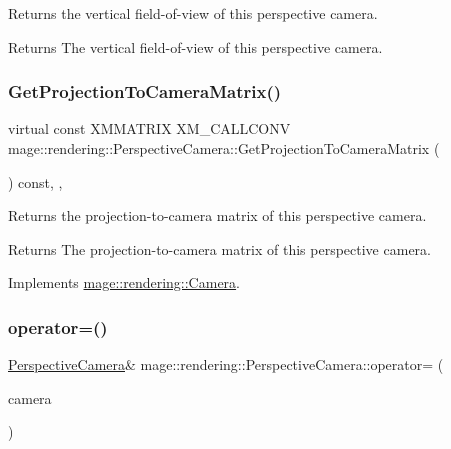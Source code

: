 Returns the vertical field-\/of-\/view of this perspective camera.

\begin{DoxyReturn}{Returns}
The vertical field-\/of-\/view of this perspective camera. 
\end{DoxyReturn}
\mbox{\label{classmage_1_1rendering_1_1_perspective_camera_af049c6330ebdaa822bfd31dc88f25ac2}} 
\subsubsection{\texorpdfstring{Get\+Projection\+To\+Camera\+Matrix()}{GetProjectionToCameraMatrix()}}
{\footnotesize\ttfamily virtual const X\+M\+M\+A\+T\+R\+IX X\+M\+\_\+\+C\+A\+L\+L\+C\+O\+NV mage\+::rendering\+::\+Perspective\+Camera\+::\+Get\+Projection\+To\+Camera\+Matrix (\begin{DoxyParamCaption}{ }\end{DoxyParamCaption}) const\hspace{0.3cm}{\ttfamily [override]}, {\ttfamily [virtual]}, {\ttfamily [noexcept]}}

Returns the projection-\/to-\/camera matrix of this perspective camera.

\begin{DoxyReturn}{Returns}
The projection-\/to-\/camera matrix of this perspective camera. 
\end{DoxyReturn}


Implements \mbox{\hyperlink{classmage_1_1rendering_1_1_camera_abb21116f8a6c7513804431d23fa4cf17}{mage\+::rendering\+::\+Camera}}.

\mbox{\label{classmage_1_1rendering_1_1_perspective_camera_ac9119d544f7ca6c4fbe1a6c5118bcd66}} 
\subsubsection{\texorpdfstring{operator=()}{operator=()}\hspace{0.1cm}{\footnotesize\ttfamily [1/2]}}
{\footnotesize\ttfamily \mbox{\hyperlink{classmage_1_1rendering_1_1_perspective_camera}{Perspective\+Camera}}\& mage\+::rendering\+::\+Perspective\+Camera\+::operator= (\begin{DoxyParamCaption}\item[{const \mbox{\hyperlink{classmage_1_1rendering_1_1_perspective_camera}{Perspective\+Camera}} \&}]{camera }\end{DoxyParamCaption})\hspace{0.3cm}{\ttfamily [delete]}}


